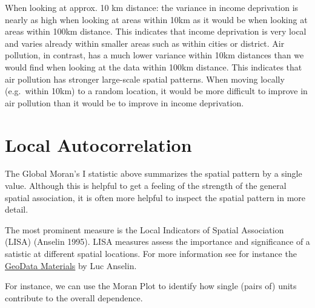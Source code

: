 \documentclass[
  letterpaper,
]{scrbook}
\newenvironment{Shaded}{\begin{snugshade}}{\end{snugshade}}
\newcommand{\FunctionTok}[1]{\textcolor[rgb]{0.28,0.35,0.67}{#1}}
\newcommand{\NormalTok}[1]{\textcolor[rgb]{0.00,0.23,0.31}{#1}}
\newcommand{\OtherTok}[1]{\textcolor[rgb]{0.00,0.23,0.31}{#1}}
\newcommand{\SpecialCharTok}[1]{\textcolor[rgb]{0.37,0.37,0.37}{#1}}
\begin{document}
When looking at approx. 10 km distance: the variance in income
deprivation is nearly as high when looking at areas within 10km as it
would be when looking at areas within 100km distance. This indicates
that income deprivation is very local and varies already within smaller
areas such as within cities or district. Air pollution, in contrast, has
a much lower variance within 10km distances than we would find when
looking at the data within 100km distance. This indicates that air
pollution has stronger large-scale spatial patterns. When moving locally
(e.g.~within 10km) to a random location, it would be more difficult to
improve in air pollution than it would be to improve in income
deprivation.

\hypertarget{local-autocorrelation}{%
\section{Local Autocorrelation}\label{local-autocorrelation}}

The Global Moran's I statistic above summarizes the spatial pattern by a
single value. Although this is helpful to get a feeling of the strength
of the general spatial association, it is often more helpful to inspect
the spatial pattern in more detail.

The most prominent measure is the Local Indicators of Spatial
Association (LISA) (Anselin 1995). LISA measures assess the importance
and significance of a satistic at different spatial locations. For more
information see for instance the
\href{https://geodacenter.github.io/workbook/6a_local_auto/lab6a.html}{GeoData
Materials} by Luc Anselin.

For instance, we can use the Moran Plot to identify how single (pairs
of) units contribute to the overall dependence.

\begin{Shaded}
\end{Shaded}
\end{document}
